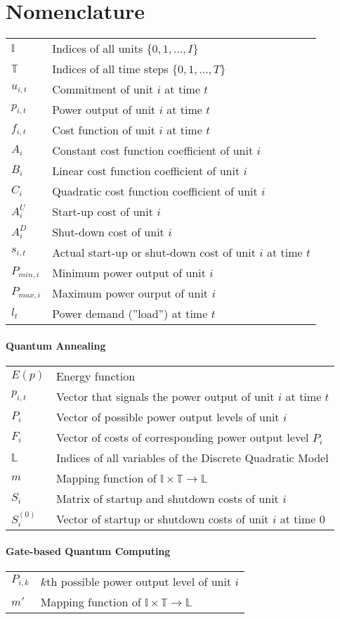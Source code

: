 \chapter*{Nomenclature}

\begin{tabular}{ll}
  $\mathbb{I}$ & Indices of all units $\{0, 1, \ldots, I\}$\\
  $\mathbb{T}$ & Indices of all time steps $\{0, 1, \ldots, T\}$ \\
  $u_{i, t}$ & Commitment of unit $i$ at time $t$ \\
  $p_{i, t}$ & Power output of unit $i$ at time $t$ \\
  $f_{i, t}$ & Cost function of unit $i$ at time $t$ \\
  $A_i$ & Constant cost function coefficient of unit $i$ \\
  $B_i$ & Linear cost function coefficient of unit $i$ \\
  $C_i$ & Quadratic cost function coefficient of unit $i$ \\
  $A^U_i$ & Start-up cost of unit $i$ \\
  $A^D_i$ & Shut-down cost of unit $i$ \\
  $s_{i, t}$ & Actual start-up or shut-down cost of unit $i$ at time $t$ \\
  $P_{min, i}$ & Minimum power output of unit $i$ \\
  $P_{max, i}$ & Maximum power ourput of unit $i$ \\
  $l_t$ & Power demand (''load'') at time $t$
\end{tabular}

\subsubsection{Quantum Annealing}

\begin{tabular}{ll}
  $E(p)$ & Energy function \\
  $p_{i, t}$ & Vector that signals the power output of unit $i$ at time $t$ \\
  $P_{i}$ & Vector of possible power output levels of unit $i$ \\
  $F_{i}$ & Vector of costs of corresponding power output level $P_{i}$ \\
  $\mathbb{L}$ & Indices of all variables of the Discrete Quadratic Model \\
  $m$ & Mapping function of $\mathbb{I} \times \mathbb{T} \to \mathbb{L}$ \\
  $S_{i}$ & Matrix of startup and shutdown costs of unit $i$ \\
  $S_i^{(0)}$ & Vector of startup or shutdown costs of unit $i$ at time $0$
\end{tabular}

\subsubsection{Gate-based Quantum Computing}

\begin{tabular}{ll}
  $P_{i, k}$ & $k$th possible power output level of unit $i$ \\
  $m'$ & Mapping function of $\mathbb{I} \times \mathbb{T} \to \mathbb{L}$
\end{tabular}
